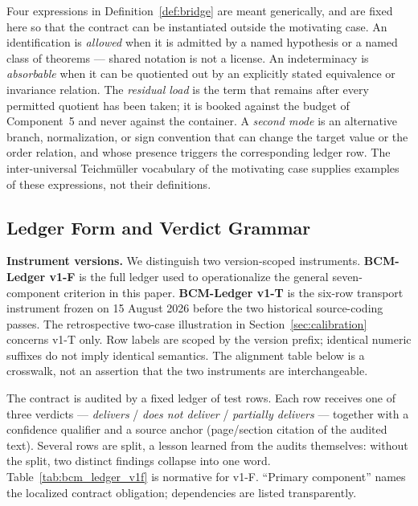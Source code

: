 \documentclass[11pt,a4paper]{article}
\begin{document}
Four expressions in Definition~\ref{def:bridge} are meant generically, and are
fixed here so that the contract can be instantiated outside the motivating
case. An identification is \emph{allowed} when it is admitted by a named
hypothesis or a named class of theorems --- shared notation is not a license.
An indeterminacy is \emph{absorbable} when it can be quotiented out by an
explicitly stated equivalence or invariance relation. The \emph{residual load}
is the term that remains after every permitted quotient has been taken; it is
booked against the budget of Component~5 and never against the container. A
\emph{second mode} is an alternative branch, normalization, or sign convention
that can change the target value or the order relation, and whose presence
triggers the corresponding ledger row. The inter-universal Teichmüller
vocabulary of the motivating case supplies examples of these expressions, not
their definitions.

\subsection{Ledger Form and Verdict Grammar}\label{sec:ledger}

\noindent\textbf{Instrument versions.} We distinguish two version-scoped
instruments. \textbf{BCM-Ledger v1-F} is the full ledger used to operationalize
the general seven-component criterion in this paper. \textbf{BCM-Ledger v1-T} is
the six-row transport instrument frozen on 15 August 2026 before the two
historical source-coding passes. The retrospective two-case illustration in
Section~\ref{sec:calibration} concerns v1-T only. Row labels are scoped by the
version prefix; identical numeric suffixes do not imply identical semantics. The
alignment table below is a crosswalk, not an assertion that the two instruments
are interchangeable.

\medskip

The contract is audited by a fixed ledger of test rows. Each row receives one of
three verdicts --- \emph{delivers} / \emph{does not deliver} / \emph{partially
delivers} --- together with a confidence qualifier and a source anchor
(page/section citation of the audited text). Several rows are split, a lesson
learned from the audits themselves: without the split, two distinct findings
collapse into one word. Table~\ref{tab:bcm_ledger_v1f} is normative for v1-F. ``Primary
component'' names the localized contract obligation; dependencies are listed
transparently.
\end{document}
